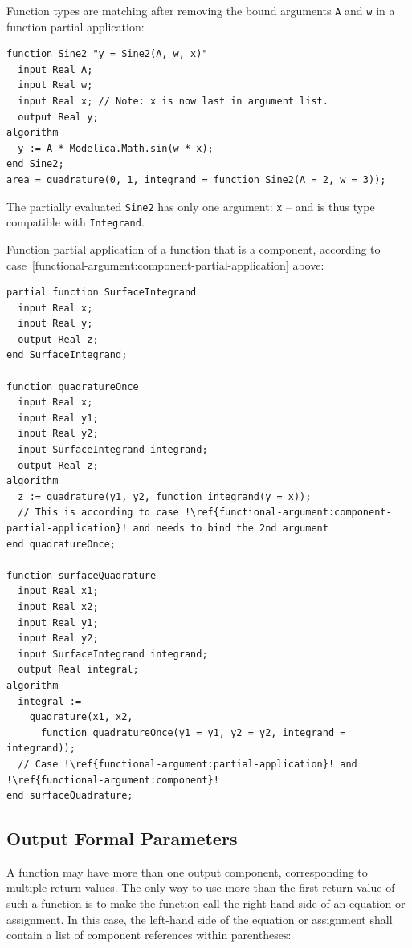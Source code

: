 \begin{example}
Function types are matching after removing the bound arguments \lstinline!A! and \lstinline!w! in a function partial application:
\begin{lstlisting}[language=modelica]
function Sine2 "y = Sine2(A, w, x)"
  input Real A;
  input Real w;
  input Real x; // Note: x is now last in argument list.
  output Real y;
algorithm
  y := A * Modelica.Math.sin(w * x);
end Sine2;
area = quadrature(0, 1, integrand = function Sine2(A = 2, w = 3));
\end{lstlisting}
The partially evaluated \lstinline!Sine2! has only one argument: \lstinline!x! -- and is thus type compatible with \lstinline!Integrand!.
\end{example}

\begin{example}
Function partial application of a function that is a component, according to case~\ref{functional-argument:component-partial-application} above:
\begin{lstlisting}[language=modelica,escapechar=!]
partial function SurfaceIntegrand
  input Real x;
  input Real y;
  output Real z;
end SurfaceIntegrand;

function quadratureOnce
  input Real x;
  input Real y1;
  input Real y2;
  input SurfaceIntegrand integrand;
  output Real z;
algorithm
  z := quadrature(y1, y2, function integrand(y = x));
  // This is according to case !\ref{functional-argument:component-partial-application}! and needs to bind the 2nd argument
end quadratureOnce;

function surfaceQuadrature
  input Real x1;
  input Real x2;
  input Real y1;
  input Real y2;
  input SurfaceIntegrand integrand;
  output Real integral;
algorithm
  integral :=
    quadrature(x1, x2,
      function quadratureOnce(y1 = y1, y2 = y2, integrand = integrand));
  // Case !\ref{functional-argument:partial-application}! and !\ref{functional-argument:component}!
end surfaceQuadrature;
\end{lstlisting}
\end{example}


\subsection{Output Formal Parameters}\label{output-formal-parameters-of-functions}

A function may have more than one output component, corresponding to multiple return values.
The only way to use more than the first return value of such a function is to make the function call the right-hand side of an equation or assignment.
In this case, the left-hand side of the equation or assignment shall contain a list of component references within parentheses:

